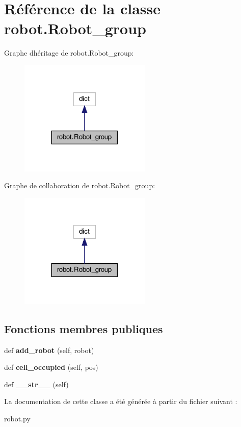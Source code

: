 \hypertarget{classrobot_1_1Robot__group}{}\section{Référence de la classe robot.\+Robot\+\_\+group}
\label{classrobot_1_1Robot__group}


Graphe d\textquotesingle{}héritage de robot.\+Robot\+\_\+group\+:\nopagebreak
\begin{figure}[H]
\begin{center}
\leavevmode
\includegraphics[width=177pt]{classrobot_1_1Robot__group__inherit__graph}
\end{center}
\end{figure}


Graphe de collaboration de robot.\+Robot\+\_\+group\+:\nopagebreak
\begin{figure}[H]
\begin{center}
\leavevmode
\includegraphics[width=177pt]{classrobot_1_1Robot__group__coll__graph}
\end{center}
\end{figure}
\subsection*{Fonctions membres publiques}
\begin{DoxyCompactItemize}
\item 
\mbox{\label{classrobot_1_1Robot__group_aed143932a9520e3c8255b76933d7eb41}} 
def {\bfseries add\+\_\+robot} (self, robot)
\item 
\mbox{\label{classrobot_1_1Robot__group_adbbbe6a28fbf51a4bfbb75ad83a85d33}} 
def {\bfseries cell\+\_\+occupied} (self, pos)
\item 
\mbox{\label{classrobot_1_1Robot__group_abd35bb6cd4e236c25155231b8a56953a}} 
def {\bfseries \+\_\+\+\_\+str\+\_\+\+\_\+} (self)
\end{DoxyCompactItemize}


La documentation de cette classe a été générée à partir du fichier suivant \+:\begin{DoxyCompactItemize}
\item 
robot.\+py\end{DoxyCompactItemize}
